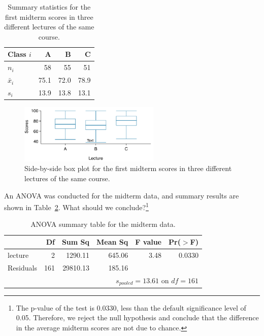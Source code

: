 \begin{table}
\centering
\begin{tabular}{lrrr}
  \hline
Class $i$	& A	& B	& C \\
  \hline
$n_i$		& 58	& 55	& 51 \\
$\bar{x}_i$	& 75.1	& 72.0	& 78.9 \\
$s_i$		& 13.9	& 13.8	& 13.1 \\
\hline
\end{tabular}
\caption{Summary statistics for the first midterm scores in three different lectures of the same course.}
\label{summaryStatisticsForClassTestData}
\end{table}

\begin{figure}
\centering
\includegraphics[width=0.6\textwidth]{ch_inference_for_means/figures/classData/classDataSBSBoxPlot}
\caption{Side-by-side box plot for the first midterm scores in three different  lectures of the same course.\textA{\vspace{-3mm}}}
\label{classDataSBSBoxPlot}
\end{figure}

\begin{exercise} \label{exerExaminingAnovaSummaryTableForMidtermData}
An ANOVA was conducted for the midterm data, and summary results are shown in Table~\ref{anovaSummaryTableForMidtermData}. What should we conclude?\footnote{The p-value of the test is 0.0330, less than the default significance level of 0.05. Therefore, we reject the null hypothesis and conclude that the difference in the average midterm scores are not due to chance.}\textA{\vspace{-3mm}}
\end{exercise}

\begin{table}[hhh]
\centering
\begin{tabular}{lrrrrr}
  \hline
 & Df & Sum Sq & Mean Sq & F value & Pr($>$F) \\
  \hline
lecture & 2 & 1290.11 & 645.06 & 3.48 & 0.0330 \\
  Residuals & 161 & 29810.13 & 185.16 &  &  \\
   \hline
\multicolumn{6}{r}{$s_{pooled}=13.61$ on $df=161$}
\end{tabular}
\caption{ANOVA summary table for the midterm data.}
\label{anovaSummaryTableForMidtermData}
\end{table}

